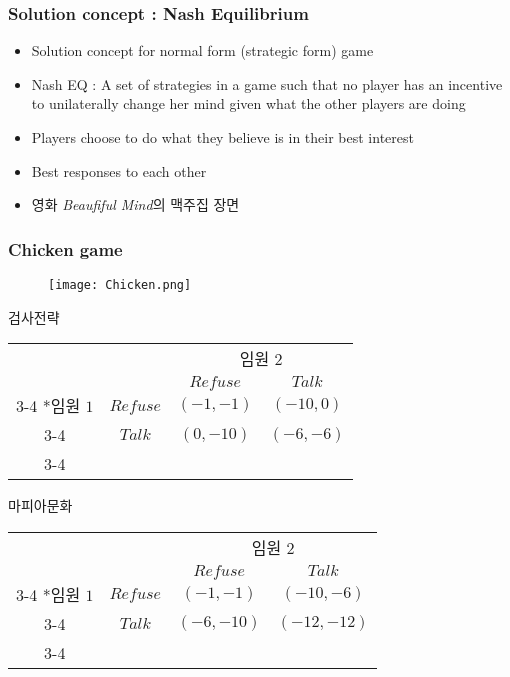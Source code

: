 \documentclass[xcolor=pdftex,dvipsnames]{beamer}
\begin{document}
\begin{frame}
\frametitle{Solution concept : Nash Equilibrium} 
\begin{itemize}
\item Solution concept for normal form (strategic form) game
\item Nash EQ : A set of strategies in a game such that no player has an incentive to unilaterally change her mind given what the other players are doing
\item Players choose to do what they believe is in their best interest
\item Best responses to each other
\item 영화 \emph{Beaufiful Mind}의 맥주집 장면
\end{itemize}
\end{frame}

\begin{frame}
\frametitle{Chicken game}
\begin{figure}
\begin{center}
  \texttt{[image: Chicken.png]}\\
\end{center}
\end{figure}
\end{frame}

\begin{frame}{검사전략}
  \begin{table}
    \setlength{\extrarowheight}{3pt}
    \begin{tabular}{cc|c|c|}
      & \multicolumn{1}{c}{} & \multicolumn{2}{c}{임원 $2$}\\
      & \multicolumn{1}{c}{} & \multicolumn{1}{c}{$Refuse$}  & \multicolumn{1}{c}{$Talk$} \\\cline{3-4}
      \multirow{2}*{임원 $1$}  & $Refuse$ & $(-1, -1)$ & $(-10, 0)$ \\\cline{3-4}
      & $Talk$ & $(0, -10)$ & $(-6, -6)$ \\\cline{3-4}
    \end{tabular}
  \end{table}
\end{frame}

\begin{frame}{마피아문화}
  \begin{table}
    \setlength{\extrarowheight}{3pt}
    \begin{tabular}{cc|c|c|}
      & \multicolumn{1}{c}{} & \multicolumn{2}{c}{임원 $2$}\\
      & \multicolumn{1}{c}{} & \multicolumn{1}{c}{$Refuse$}  & \multicolumn{1}{c}{$Talk$} \\\cline{3-4}
      \multirow{2}*{임원 $1$}  & $Refuse$ & $(-1, -1)$ & $(-10,-6)$ \\\cline{3-4}
      & $Talk$ & $(-6, -10)$ & $(-12, -12)$ \\\cline{3-4}
    \end{tabular}
  \end{table}
\end{frame}
\end{document}
